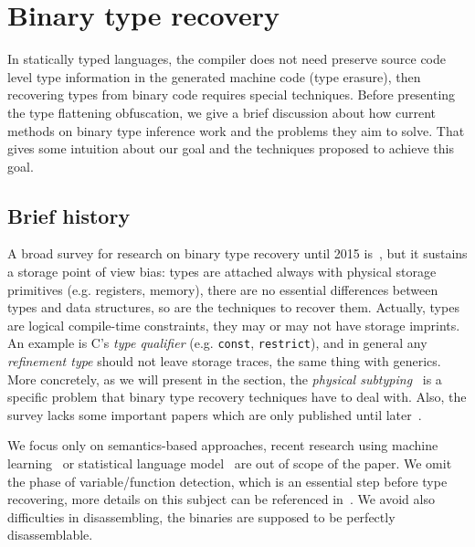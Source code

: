 \documentclass[compsoc,conference,a4paper,10pt,times]{IEEEtran}
\begin{document}
\section{Binary type recovery}
\noindent
In statically typed languages, the compiler does not need preserve source code level type information in
the generated machine code (type erasure), then recovering types from binary code requires special
techniques. Before
presenting the type flattening obfuscation, we give a brief discussion about how current methods on binary type
inference work and the problems they aim to solve.
That gives some intuition about our goal and the techniques proposed to achieve this goal.

\subsection{Brief history}
\noindent
A broad survey for research on binary type recovery until 2015 is~\cite{caballero_type_2016}, but it sustains a storage point of view bias: types are attached
always with physical storage primitives (e.g. registers, memory), there are no essential differences between types and
data structures, so are the techniques to recover them. Actually, types are logical compile-time constraints, they
may or may not have storage imprints. An example is C's \emph{type qualifier} (e.g.
\texttt{\small const}, \texttt{\small restrict}), and in general any
\emph{refinement type} should not leave storage traces, the same thing with generics. More concretely, as
we will present in the section, the \emph{physical subtyping}~\cite{siff_coping_1999} is a specific problem that binary type
recovery techniques have to deal with.
Also, the survey lacks some important
papers which are only published until later~\cite{noonan_polymorphic_2016,robbins_minx_2016}.

We focus only on semantics-based approaches, recent research using machine learning~\cite{maier_typeminer_2019}
or statistical language model~\cite{katz_estimating_2016} are out of scope of the paper.
We omit the phase of variable/function detection, which is an essential step before
type recovering, more details on this subject can be referenced in~\cite{balakrishnan_divine_2007}.
We avoid also difficulties in disassembling, the binaries are supposed to be perfectly disassemblable.

\end{document}
